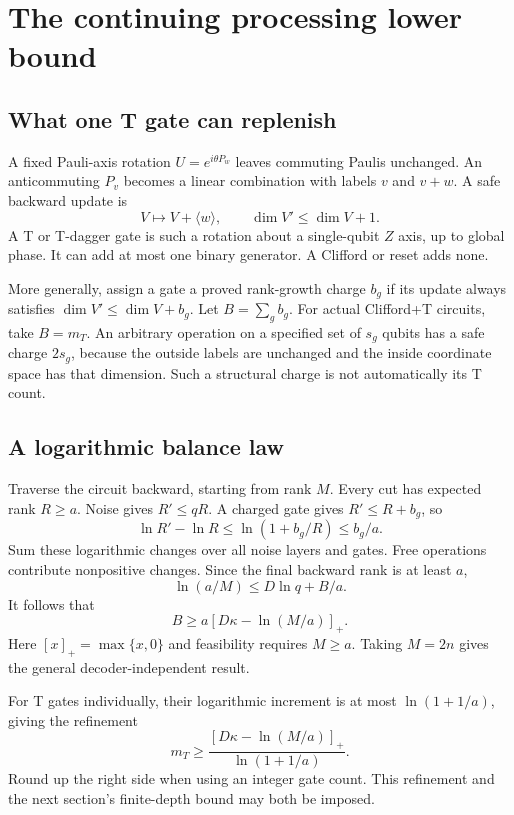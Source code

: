 \documentclass[11pt,a4paper]{article}
\numberwithin{equation}{section}
\theoremstyle{remark}\newtheorem*{remark}{Interpretation}
\newcommand{\positive}[1]{\left[#1\right]_+}
\begin{document}
\section{The continuing processing lower bound}
\subsection{What one T gate can replenish}
A fixed Pauli-axis rotation $U=e^{i\theta P_w}$ leaves commuting Paulis unchanged. An anticommuting $P_v$ becomes a linear combination with labels $v$ and $v+w$. A safe backward update is
\begin{equation}
V\longmapsto V+\langle w\rangle,\qquad
\dim V'\le\dim V+1.
\end{equation}
A T or T-dagger gate is such a rotation about a single-qubit $Z$ axis, up to global phase. It can add at most one binary generator. A Clifford or reset adds none.

More generally, assign a gate a proved rank-growth charge $b_g$ if its update always satisfies $\dim V'\le\dim V+b_g$. Let $B=\sum_g b_g$. For actual Clifford+T circuits, take $B=m_T$. An arbitrary operation on a specified set of $s_g$ qubits has a safe charge $2s_g$, because the outside labels are unchanged and the inside coordinate space has that dimension. Such a structural charge is not automatically its T count.

\subsection{A logarithmic balance law}
Traverse the circuit backward, starting from rank $M$. Every cut has expected rank $R\ge a$. Noise gives $R'\le qR$. A charged gate gives $R'\le R+b_g$, so
\begin{equation}
\ln R'-\ln R\le\ln(1+b_g/R)\le b_g/a.
\end{equation}
Sum these logarithmic changes over all noise layers and gates. Free operations contribute nonpositive changes. Since the final backward rank is at least $a$,
\begin{equation}
\ln(a/M)\le D\ln q+B/a.
\end{equation}
It follows that
\begin{equation}
\boxed{B\ge a\positive{D\kappa-\ln(M/a)}.}
\label{eq:budget}
\end{equation}
Here $[x]_+=\max\{x,0\}$ and feasibility requires $M\ge a$. Taking $M=2n$ gives the general decoder-independent result.

For T gates individually, their logarithmic increment is at most $\ln(1+1/a)$, giving the refinement
\begin{equation}
m_T\ge
\frac{\positive{D\kappa-\ln(M/a)}}{\ln(1+1/a)}.
\label{eq:integer}
\end{equation}
Round up the right side when using an integer gate count. This refinement and the next section's finite-depth bound may both be imposed.
\end{document}

